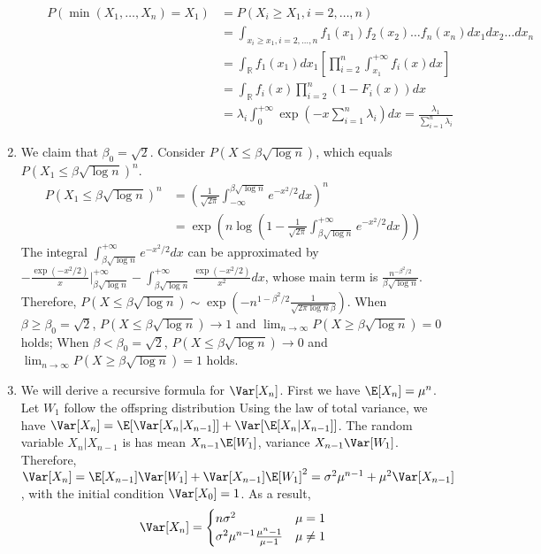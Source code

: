 \documentclass{article}
\begin{document}
\begin{enumerate}
\begin{enumerate}[label=(\roman*)]
\begin{align*}
        P(\min(X_1, \dots, X_n) = X_1)
        &= P(X_i \geq X_1, i=2,\dots,n) \\
        &=\int_{x_i \geq x_1, i=2,\dots,n}
        f_1(x_1)f_2(x_2) \dots f_n(x_n) dx_1dx_2\dots dx_n \\
        & = \int_{\mathbb{R}}
        f_1(x_1)dx_1 [\prod_{i=2}^n \int_{x_1}^{+\infty} f_i(x)dx] \\
        & =  \int_{\mathbb{R}}
        f_i(x)\prod_{i=2}^n(1-F_i(x))dx  \\
        & = \lambda_i\int_{0}^{+\infty} \exp(-x \sum_{i=1}^n \lambda_i)dx = \frac{\lambda_1}{\sum_{i=1}^n \lambda_i}
    \end{align*}
\end{enumerate}
\item We claim that $\beta_0 = \sqrt{2}$.
Consider $P(X \leq \beta \sqrt{\log n})$, which equals $P(X_1 \leq
\beta \sqrt{\log n})^n$.
\begin{align*}
    P(X_1 \leq
\beta \sqrt{\log n})^n &= \left( \frac{1}{\sqrt{2\pi}} \int_{-\infty}^
{\beta \sqrt{\log n}} e^{-x^2/2}dx
\right)^n \\
&=\exp(n\log \left(1-\frac{1}{\sqrt{2\pi}} \int_{\beta \sqrt{\log n}}^
{+\infty} e^{-x^2/2}dx\right))
\end{align*}
The integral $\int_{\beta \sqrt{\log n}}^
{+\infty} e^{-x^2/2}dx$ can be approximated by
$-\frac{\exp(-x^2/2)}{x}\Big\vert_{\beta \sqrt{\log n}}^{+\infty} -\int_{\beta \sqrt{\log n}}^
{+\infty} \frac{\exp(-x^2/2)}{x^2}dx$, whose main term is $\frac{n^{-\beta^2/2}}{\beta \sqrt{\log n}}$.
Therefore, $P(X \leq \beta \sqrt{\log n})
\sim \exp(-n^{1-\beta^2/2}\frac{1}{\sqrt{2\pi \log n} \beta})$.
When $\beta\geq \beta_0=\sqrt{2}$, $P(X \leq \beta \sqrt{\log n}) \to 1$
and $\lim_{n \to \infty}P(X \geq \beta \sqrt{\log n}) = 0$ holds;
When $\beta< \beta_0=\sqrt{2}$, $P(X \leq \beta \sqrt{\log n}) \to 0$
and $\lim_{n \to \infty}P(X \geq \beta \sqrt{\log n}) = 1$ holds.


\item We will derive a recursive formula for $\Var[X_n]$. First we have $\E[X_n]=\mu^n$.
Let $W_1$ follow the offspring distribution
Using the law of total variance, we have
$\Var[X_n]=\E[\Var[X_n|X_{n-1}]] + \Var[\E[X_n | X_{n-1}]]$.
The random variable $X_n | X_{n-1}$ is has mean $X_{n-1} \E[W_1]$, variance
$X_{n-1}\Var[W_1]$. Therefore,
$\Var[X_n]=\E[X_{n-1}]\Var[W_1] + \Var[X_{n-1}]\E[W_1]^2
= \sigma^2 \mu^{n-1} + \mu^2 \Var[X_{n-1}]$, with the initial condition
$\Var[X_0]=1$.
As a result,
\begin{equation*}
    \Var[X_n] =\begin{cases}
    n\sigma^2 & \mu = 1\\
    \sigma^2 \mu^{n-1}
    \frac{\mu^n - 1}{\mu-1} & \mu \neq 1 \\
    \end{cases}
\end{equation*} 
\end{enumerate}
\end{document}
